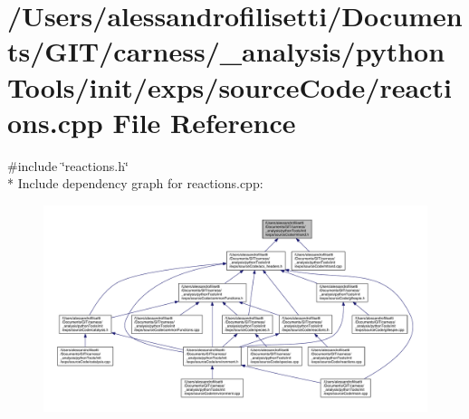 \hypertarget{a00074}{\section{/\-Users/alessandrofilisetti/\-Documents/\-G\-I\-T/carness/\-\_\-analysis/python\-Tools/init/exps/source\-Code/reactions.cpp File Reference}
\label{a00074}
}
{\ttfamily \#include \char`\"{}reactions.\-h\char`\"{}}\\*
Include dependency graph for reactions.\-cpp\-:
\nopagebreak
\begin{figure}[H]
\begin{center}
\leavevmode
\includegraphics[width=350pt]{a00194}
\end{center}
\end{figure}
